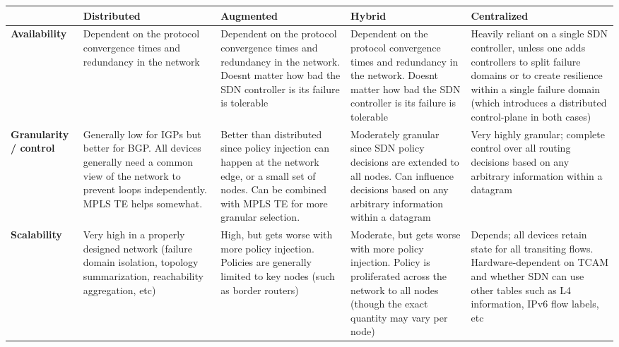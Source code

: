 \begin{longtable}{LLLLL}

\toprule
&
\textbf{Distributed}
&
\textbf{Augmented}
&
\textbf{Hybrid}
&
\textbf{Centralized}
\\ \midrule
\textbf{Availability}
&
Dependent on the protocol convergence times and redundancy in the network
&
Dependent on the protocol convergence times and redundancy in the network.
Doesnt matter how bad the SDN controller is its failure is tolerable
&
Dependent on the protocol convergence times and redundancy in the network.
Doesnt matter how bad the SDN controller is  its failure is tolerable
&
Heavily reliant on a single SDN controller, unless one adds controllers to
split failure domains or to create resilience within a single failure domain
(which introduces a distributed control-plane in both cases)
\\ \midrule
\textbf{Granularity / control}
&
Generally low for IGPs but better for BGP. All devices generally need a common
view of the network to prevent loops independently. MPLS TE helps somewhat.
&
Better than distributed since policy injection can happen at the network edge,
or a small set of nodes. Can be combined with MPLS TE for more granular selection.
&
Moderately granular since SDN policy decisions are extended to all nodes. Can
influence decisions based on any arbitrary information within a datagram
&
Very highly granular; complete control over all routing decisions based on any
arbitrary information within a datagram
\\ \midrule
\textbf{Scalability}
&
Very high in a properly designed network (failure domain isolation, topology
summarization, reachability aggregation, etc)
&
High, but gets worse with more policy injection. Policies are generally
limited to key nodes (such as border routers)
&
Moderate, but gets worse with more policy injection. Policy is proliferated
across the network to all nodes (though the exact quantity may vary per node)
&
Depends; all devices retain state for all transiting flows. Hardware-dependent
on TCAM and whether SDN can use other tables such as L4 information, IPv6 flow
labels, etc
\\
\bottomrule
\end{longtable}




